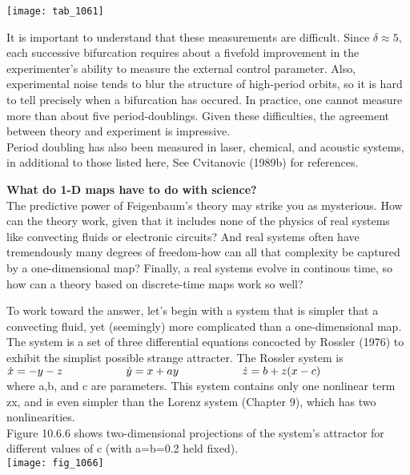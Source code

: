 \documentclass{article}
\newcommand\tab[1][1cm]{\hspace*{#1}}
\begin{document}
\texttt{[image: tab\_1061]}

\tab It is important to understand that these measurements are difficult. Since $\delta \approx 5,$ each successive bifurcation requires about a fivefold improvement in the experimenter's ability to measure the external control parameter. Also, experimental noise tends to blur the structure of high-period orbits, so it is hard to tell precisely when a bifurcation has occured. In practice, one cannot measure more than about five period-doublings. Given these difficulties, the agreement between theory and experiment is impressive. \\ \tab
Period doubling has also been measured in laser, chemical, and acoustic systems, in additional to those listed here, See Cvitanovic (1989b) for references. 

\textbf {What do 1-D maps have to do with science?} \\

\tab The predictive power of Feigenbaum's theory may strike you as mysterious. How can the theory work, given that it includes none of the physics of real systems like convecting fluids or electronic circuits? And real systems often have tremendously many degrees of freedom-how can all that complexity be captured by a one-dimensional map? Finally, a real systems evolve in continous time, so how can a theory based on discrete-time maps work so well? \\ \tab

To work toward the answer, let's begin with a system that is simpler that  a convecting fluid, yet (seemingly) more complicated than a one-dimensional map. The system is a set of three differential equations concocted by Rossler (1976) to exhibit the simplist possible strange attracter. The Rossler system is \\ \tab \tab
$\dot{x}=-y -z \\ \tab \tab
\dot{y}=x+ay \\ \tab \tab
\dot{z}=b+z(x-c)$ \\
where a,b, and c are parameters. This system contains only one nonlinear term zx, and is even simpler than the Lorenz system (Chapter 9), which has two nonlinearities. \\ \tab 
Figure 10.6.6 shows two-dimensional projections of the system's attractor for different values of c (with a=b=0.2 held fixed). \\

\texttt{[image: fig\_1066]}
\end{document}
